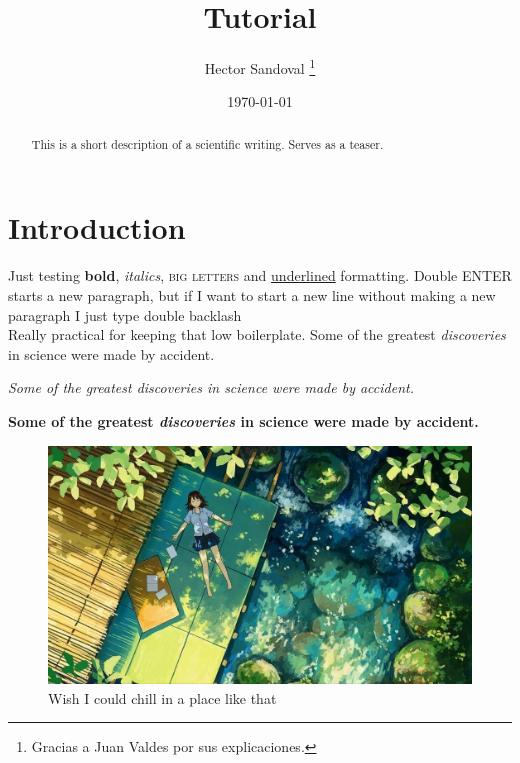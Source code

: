 \documentclass[12pt, es]{article}
\title{Tutorial}
\author{Hector Sandoval \thanks{Gracias a Juan Valdes por sus explicaciones.}}
\date{\today}
\begin{document}
\maketitle

\tableofcontents
\addcontentsline %

\begin{abstract}
    This is a short description of a scientific writing. Serves as a teaser.
\end{abstract}

\section{Introduction}

Just testing \textbf{bold}, \textit{italics}, \textsc{big letters} and \underline{underlined} formatting. 
Double ENTER starts a new paragraph, but if I want to start a new line without making a new paragraph I just type double backlash \\ Really practical for keeping that low boilerplate.
Some of the greatest \emph{discoveries} in science 
were made by accident.

\textit{Some of the greatest \emph{discoveries} 
in science were made by accident.}

\textbf{Some of the greatest \emph{discoveries} 
in science were made by accident.}

\begin{figure}
    \centering
    \includegraphics[width=0.5\linewidth]{riverside.jpg}
    \caption{Wish I could chill in a place like that}
    \label{fig:enter-label}
\end{figure}

\end{document}

